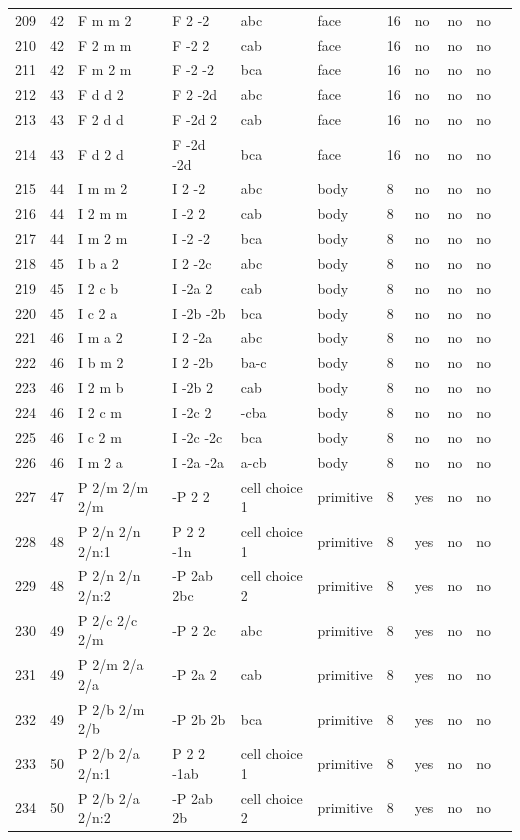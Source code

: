 \begin{center}
\begin{small}
\begin{longtable}{|l|l|l|l|l|l|l|l|l|l|l|}
209 &42 &F m m 2 &F 2 -2 &abc &face &16 &no &no &no \\ 
210 &42 &F 2 m m &F -2 2 &cab &face &16 &no &no &no \\ 
211 &42 &F m 2 m &F -2 -2 &bca &face &16 &no &no &no \\ 
212 &43 &F d d 2 &F 2 -2d &abc &face &16 &no &no &no \\ 
213 &43 &F 2 d d &F -2d 2 &cab &face &16 &no &no &no \\ 
214 &43 &F d 2 d &F -2d -2d &bca &face &16 &no &no &no \\ 
215 &44 &I m m 2 &I 2 -2 &abc &body &8 &no &no &no \\ 
216 &44 &I 2 m m &I -2 2 &cab &body &8 &no &no &no \\ 
217 &44 &I m 2 m &I -2 -2 &bca &body &8 &no &no &no \\ 
218 &45 &I b a 2 &I 2 -2c &abc &body &8 &no &no &no \\ 
219 &45 &I 2 c b &I -2a 2 &cab &body &8 &no &no &no \\ 
220 &45 &I c 2 a &I -2b -2b &bca &body &8 &no &no &no \\ 
221 &46 &I m a 2 &I 2 -2a &abc &body &8 &no &no &no \\ 
222 &46 &I b m 2 &I 2 -2b &ba-c &body &8 &no &no &no \\ 
223 &46 &I 2 m b &I -2b 2 &cab &body &8 &no &no &no \\ 
224 &46 &I 2 c m &I -2c 2 &-cba &body &8 &no &no &no \\ 
225 &46 &I c 2 m &I -2c -2c &bca &body &8 &no &no &no \\ 
226 &46 &I m 2 a &I -2a -2a &a-cb &body &8 &no &no &no \\ 
227 &47 &P 2/m 2/m 2/m &-P 2 2 &cell choice 1 &primitive &8 &yes &no &no \\ 
228 &48 &P 2/n 2/n 2/n:1 &P 2 2 -1n &cell choice 1 &primitive &8 &yes &no &no \\ 
229 &48 &P 2/n 2/n 2/n:2 &-P 2ab 2bc &cell choice 2 &primitive &8 &yes &no &no \\ 
230 &49 &P 2/c 2/c 2/m &-P 2 2c &abc &primitive &8 &yes &no &no \\ 
231 &49 &P 2/m 2/a 2/a &-P 2a 2 &cab &primitive &8 &yes &no &no \\ 
232 &49 &P 2/b 2/m 2/b &-P 2b 2b &bca &primitive &8 &yes &no &no \\ 
233 &50 &P 2/b 2/a 2/n:1 &P 2 2 -1ab &cell choice 1 &primitive &8 &yes &no &no \\ 
234 &50 &P 2/b 2/a 2/n:2 &-P 2ab 2b &cell choice 2 &primitive &8 &yes &no &no \\ 

\end{longtable}
\end{small}
\end{center}
